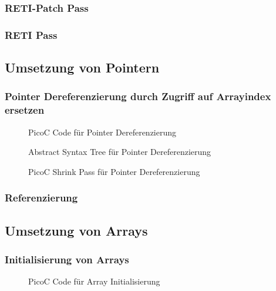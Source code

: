 \subsubsection{RETI-Patch Pass}
\subsubsection{RETI Pass}

\subsection{Umsetzung von Pointern}
\subsubsection{Pointer Dereferenzierung durch Zugriff auf Arrayindex ersetzen}
\begin{figure}[H]
  \centering
  \caption{PicoC Code für Pointer Dereferenzierung}
  \label{fig:picoc_code_für_pointer_dereferenzierung}
\end{figure}

\begin{figure}[H]
  \centering
  \caption{Abstract Syntax Tree für Pointer Dereferenzierung}
  \label{fig:abstract_syntax_tree_für_pointer_dereferenzierung}
\end{figure}

\begin{figure}[H]
  \centering
  \caption{PicoC Shrink Pass für Pointer Dereferenzierung}
  \label{fig:picoc_shrink_für_pointer_dereferenzierung}
\end{figure}

\subsubsection{Referenzierung}

\subsection{Umsetzung von Arrays}
\subsubsection{Initialisierung von Arrays}
\begin{figure}[H]
  \centering
  \caption{PicoC Code für Array Initialisierung}
  \label{fig:picoc_code_für_array_initialisierung}
\end{figure}

